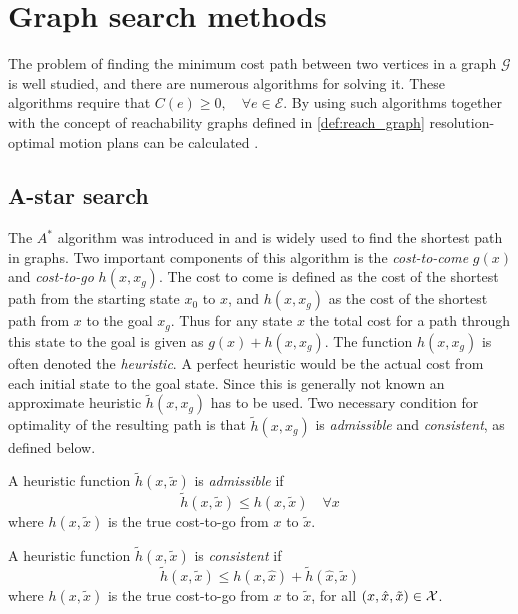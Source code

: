 \section{Graph search methods}
The problem of finding the minimum cost path between two vertices in a graph $\mathcal{G}$
is well studied, and there are numerous algorithms for solving it. These algorithms require that 
$C(e)\geq0,\quad \forall e\in\mathcal{E}$. By using such algorithms together with the concept of 
reachability graphs defined in \eqref{def:reach_graph} resolution-optimal motion plans can be calculated \cite{Bergman_lic}. 

\subsection{A-star search}\label{sec:a-star}
The $A^*$ algorithm was introduced in \cite{astar} and is widely used to find the shortest path in graphs.
Two important components of this algorithm is the \textit{cost-to-come} $g(x)$ and \textit{cost-to-go} $h(x,x_g)$. The cost to come is defined as 
the cost of the shortest path from the starting state $x_0$ to $x$, and $h(x, x_g)$ as the cost of the shortest path from $x$ to the goal $x_g$.
Thus for any state $x$ the total cost for a path through this state to the goal is given as $g(x)+h(x,x_g)$. The function $h(x, x_g)$ is often denoted the \textit{heuristic}.
A perfect heuristic would be the actual cost from each initial state to the goal state. 
Since this is generally not known an approximate heuristic $\tilde{h}(x, x_g)$ has to be used. Two necessary 
condition for optimality of the resulting path is that $\tilde{h}(x, x_g)$ is \textit{admissible} and \textit{consistent}, as defined below.

\begin{definition}
    A heuristic function $\tilde{h}(x, \tilde{x})$ is \textit{admissible} if
    \begin{equation}
        \tilde{h}(x, \tilde{x})\leq h(x, \tilde{x}) \quad\forall x
    \end{equation}
    where $h(x, \tilde{x})$ is the true cost-to-go from $x$ to $\tilde{x}$.    
\end{definition}

\begin{definition}
    A heuristic function $\tilde{h}(x, \tilde{x})$ is \textit{consistent} if
    \begin{equation}
        \tilde{h}(x, \tilde{x})\leq h(x, \hat{x}) + \tilde{h}(\hat{x}, \tilde{x})
    \end{equation}
    where $h(x, \tilde{x})$ is the true cost-to-go from $x$ to $\tilde{x}$, 
    for all $(x,\hat{x},\tilde{x})\in\mathcal{X}$.
\end{definition}

